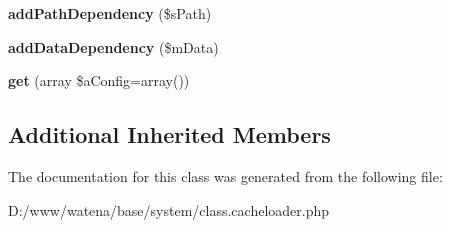 \begin{DoxyCompactItemize}
\item 
\hypertarget{class_cache_loader_ad26013bd594c4e25d92d03272e5acba9}{{\bfseries add\-Path\-Dependency} (\$s\-Path)}\label{class_cache_loader_ad26013bd594c4e25d92d03272e5acba9}

\item 
\hypertarget{class_cache_loader_a805e6f9713d9349b2304c52cfa468bd8}{{\bfseries add\-Data\-Dependency} (\$m\-Data)}\label{class_cache_loader_a805e6f9713d9349b2304c52cfa468bd8}

\item 
\hypertarget{class_cache_loader_afc64627f8db1b3ab4690d203adf7d23a}{{\bfseries get} (array \$a\-Config=array())}\label{class_cache_loader_afc64627f8db1b3ab4690d203adf7d23a}

\end{DoxyCompactItemize}
\subsection*{Additional Inherited Members}


The documentation for this class was generated from the following file\-:\begin{DoxyCompactItemize}
\item 
D\-:/www/watena/base/system/class.\-cacheloader.\-php\end{DoxyCompactItemize}

